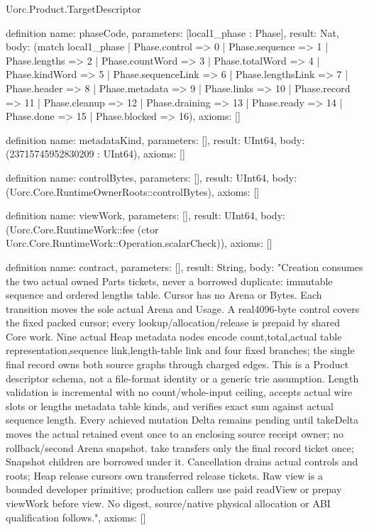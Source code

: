 \begin{lexlean}{Uorc.Product.TargetDescriptor}
\begin{semanticmodule}
definition{
  name: phaseCode,
  parameters: [local1_phase : Phase],
  result: Nat,
  body: (match local1_phase
    | Phase.control => 0
    | Phase.sequence => 1
    | Phase.lengths => 2
    | Phase.countWord => 3
    | Phase.totalWord => 4
    | Phase.kindWord => 5
    | Phase.sequenceLink => 6
    | Phase.lengthsLink => 7
    | Phase.header => 8
    | Phase.metadata => 9
    | Phase.links => 10
    | Phase.record => 11
    | Phase.cleanup => 12
    | Phase.draining => 13
    | Phase.ready => 14
    | Phase.done => 15
    | Phase.blocked => 16),
  axioms: []
}

definition{
  name: metadataKind,
  parameters: [],
  result: UInt64,
  body: (23715745952830209 : UInt64),
  axioms: []
}

definition{
  name: controlBytes,
  parameters: [],
  result: UInt64,
  body: (Uorc.Core.RuntimeOwnerRoots::controlBytes),
  axioms: []
}

definition{
  name: viewWork,
  parameters: [],
  result: UInt64,
  body: (Uorc.Core.RuntimeWork::fee (ctor Uorc.Core.RuntimeWork::Operation.scalarCheck)),
  axioms: []
}

definition{
  name: contract,
  parameters: [],
  result: String,
  body: "Creation consumes the two actual owned Parts tickets, never a borrowed duplicate: immutable sequence and ordered lengths table. Cursor has no Arena or Bytes. Each transition moves the sole actual Arena and Usage. A real4096-byte control covers the fixed packed cursor; every lookup/allocation/release is prepaid by shared Core work. Nine actual Heap metadata nodes encode count,total,actual table representation,sequence link,length-table link and four fixed branches; the single final record owns both source graphs through charged edges. This is a Product descriptor schema, not a file-format identity or a generic trie assumption. Length validation is incremental with no count/whole-input ceiling, accepts actual wire slots or lengths metadata table kinds, and verifies exact sum against actual sequence length. Every achieved mutation Delta remains pending until takeDelta moves the actual retained event once to an enclosing source receipt owner; no rollback/second Arena snapshot. take transfers only the final record ticket once; Snapshot children are borrowed under it. Cancellation drains actual controls and roots; Heap release cursors own transferred release tickets. Raw view is a bounded developer primitive; production callers use paid readView or prepay viewWork before view. No digest, source/native physical allocation or ABI qualification follows.",
  axioms: []
}


\end{semanticmodule}
\end{lexlean}
